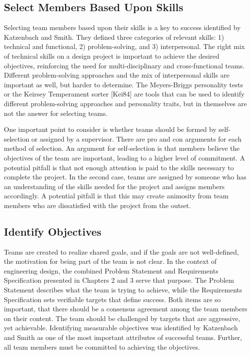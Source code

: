 \subsection{Select Members Based Upon Skills}
\label{subsetion:select-members-based-upon-skills}

Selecting team members based upon their skills is a key to success
identified by Katzenbach and Smith. They defined three categories of
relevant skills: 1) technical and functional, 2) problem-solving, and 3)
interpersonal. The right mix of technical skills on a design project is
important to achieve the desired objectives, reinforcing the need for
multi-disciplinary and cross-functional teams. Different problem-solving
approaches and the mix of interpersonal skills are important as well,
but harder to determine. The Meyers-Briggs personality tests or the
Keirsey Temperament sorter {[}Kei84{]} are tools that can be used to
identify different problem-solving approaches and personality traits,
but in themselves are not the answer for selecting teams.

One important point to consider is whether teams should be formed by
self-selection or assigned by a supervisor. There are pro and con
arguments for each method of selection. An argument for self-selection
is that members believe the objectives of the team are important,
leading to a higher level of commitment. A potential pitfall is that not
enough attention is paid to the skills necessary to complete the
project. In the second case, teams are assigned by someone who has an
understanding of the skills needed for the project and assigns members
accordingly. A potential pitfall is that this may create animosity from
team members who are dissatisfied with the project from the outset.

\subsection{Identify Objectives}
\label{subsection:identify-objectives}

Teams are created to realize shared goals, and if the goals are not
well-defined, the motivation for being part of the team is not clear. In
the context of engineering design, the combined Problem Statement and
Requirements Specification presented in Chapters 2 and 3 serve that
purpose. The Problem Statement describes what the team is trying to
achieve, while the Requirements Specification sets verifiable targets
that define success. Both items are so important, that there should be a
consensus agreement among the team members on their content. The team
should be challenged by targets that are aggressive, yet achievable.
Identifying measurable objectives was identified by Katzenbach and Smith
as one of the most important attributes of successful teams. Further,
all team members must be committed to achieving the objectives.

